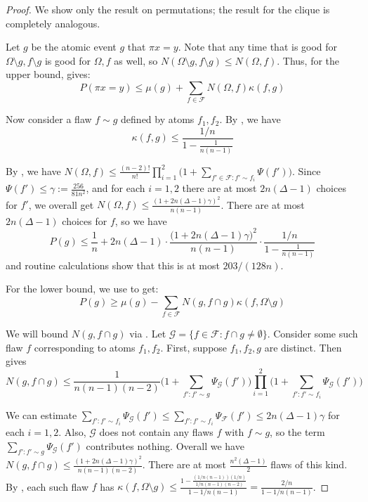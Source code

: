 \documentclass{toc}
\begin{document}
\begin{proof}
  We show only the result on permutations; the result for the clique is completely analogous. 
  
  
Let $g$ be the atomic event $g$ that $\pi x = y$.   Note that any time that is good for $\Omega \setminus g, f \setminus g$ is good for $\Omega, f$ as well, so $N( \Omega \setminus g, f \setminus g) \leq N(\Omega,  f)$. Thus, for the upper bound,  gives:
  $$
  P( \pi x = y) \leq \mu(g) + \sum_{f \in \mathcal F} N(\Omega, f) \kappa(f, g)
  $$
  
  Now consider a flaw $f \sim g$ defined by atoms $f_1, f_2$. By , we have
  $$
  \kappa(f,g) \leq \frac{1/n}{1 - \frac{1}{n(n-1)}}
   $$
  
  By  , we have $N( \Omega, f) \leq \frac{ (n-2)! }{n!} \prod_{i=1}^2 \bigl(1 + \sum_{f' \in \mathcal F: f' \sim f_i} \Psi(f') \bigr)$. Since $\Psi(f') \leq \gamma := \frac{256}{81 n^2}$, and for each $i = 1,2$ there are at most $2 n (\Delta-1)$ choices for $f'$, we overall get $ N(\Omega, f) \leq \frac{ ( 1 + 2 n (\Delta-1) \gamma)^2}{n(n-1)}$. There are at most $2 n (\Delta - 1)$ choices for $f$, so we have
 $$
  P(g) \leq \frac{1}{n}  + 2 n (\Delta-1) \cdot \frac{( 1 + 2 n (\Delta-1) \gamma \bigr)^2}{n(n-1)} \cdot \frac{ 1/n}{1 - \frac{1}{n(n-1)}}
  $$
  and routine calculations show that this is at most $203/(128 n)$.

For the lower bound, we use  to get:
$$
P(g) \geq \mu(g) - \sum_{f \in \mathcal F} N( g, f \cap g)  \kappa(f, \Omega \setminus g)
  $$
  
We will bound $N( g, f \cap g)$ via . Let  $\mathcal G = \{f \in \mathcal F: f \cap g \neq \emptyset \}$. Consider some such flaw $f$ corresponding to atoms $f_1, f_2$. First, suppose $f_1, f_2, g$ are distinct.  Then    gives $$
N(  g, f \cap g) \leq \frac{1}{n(n-1)(n-2)}  \bigl( 1 + \sum_{f': f' \sim g} \Psi_{\mathcal G}(f') \bigr) \prod_{i=1}^2 \bigl(1 + \sum_{f': f' \sim f_i} \Psi_{\mathcal G}(f') \bigr)
$$

We can estimate $ \sum_{f': f' \sim f_i} \Psi_{\mathcal G}(f') \leq \sum_{f': f' \sim f_i} \Psi_{\mathcal F}(f')  \leq 2 n (\Delta - 1) \gamma$ for each $i = 1,2$. Also, $\mathcal G$ does not contain any flaws $f$ with $f \sim g$, so the term $\sum_{f': f' \sim g} \Psi_{\mathcal G}(f')$ contributes nothing. Overall we have $N(  g, f \cap g) \leq \frac{ (1 + 2 n (\Delta - 1) \gamma)^2}{n(n-1)(n-2)}$.  There are at most $\frac{n^2 (\Delta-1)}{2}$ flaws of this kind. By , each such flaw $f$ has $\kappa(f, \Omega \setminus g) \leq \frac{1 - \frac{(1/n(n-1)) (1/n)}{1/n(n-1)(n-2)}}{1 - 1/n(n-1)} = \frac{2/n}{1-1/n(n-1)}$. 



\end{proof}
\end{document}
